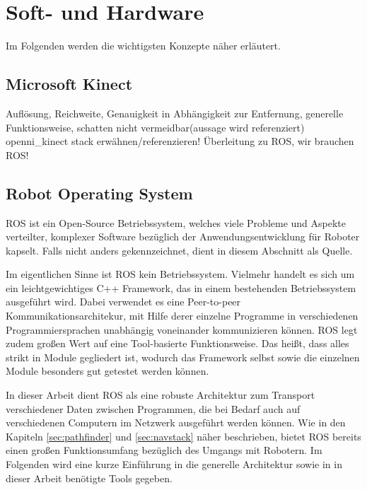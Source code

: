 \section{Soft- und Hardware}
\label{sec:softundhardware}

Im Folgenden werden die wichtigsten Konzepte näher erläutert.

\subsection{Microsoft Kinect}
\label{subsec:kinect}
{\color{red}Auflösung, Reichweite, Genauigkeit in Abhängigkeit zur Entfernung, generelle Funktionsweise, schatten nicht vermeidbar(aussage wird referenziert)}
{\color{red}openni\_kinect stack erwähnen/referenzieren!}
{\color{red}Überleitung zu ROS, wir brauchen ROS!}

\subsection{Robot Operating System}

\gls{ROS} ist ein Open-Source Betriebssystem, welches viele Probleme und Aspekte verteilter, komplexer Software bezüglich der Anwendungsentwicklung für Roboter kapselt. Falls nicht anders gekennzeichnet, dient \cite{Quigley:2009kx} in diesem Abschnitt als Quelle.

Im eigentlichen Sinne ist \gls{ROS} kein Betriebssystem. Vielmehr handelt es sich um ein leichtgewichtiges C++ Framework, das in einem bestehenden Betriebssystem ausgeführt wird. Dabei verwendet es eine Peer-to-peer Kommunikationsarchitekur, mit Hilfe derer einzelne Programme in verschiedenen Programmiersprachen unabhängig voneinander kommunizieren können. \gls{ROS} legt zudem großen Wert auf eine Tool-basierte Funktionsweise. Das heißt, dass alles strikt in Module gegliedert ist, wodurch das Framework selbst sowie die einzelnen Module besonders gut getestet werden können.

In dieser Arbeit dient \gls{ROS} als eine robuste Architektur zum Transport verschiedener Daten zwischen Programmen, die bei Bedarf auch auf verschiedenen Computern im Netzwerk ausgeführt werden können. Wie in den Kapiteln \ref{sec:pathfinder} und \ref{sec:navstack} näher beschrieben, bietet \gls{ROS} bereits einen großen Funktionsumfang bezüglich des Umgangs mit Robotern. Im Folgenden wird eine kurze Einführung in die generelle Architektur sowie in in dieser Arbeit benötigte Tools gegeben.

